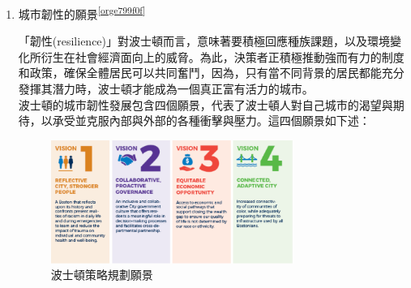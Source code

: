 \documentclass[a4paper,12pt]{article}
\begin{document}
\begin{enumerate}
\begin{enumerate}
\item 城市韌性的願景\textsuperscript{\ref{orge799f0f}}
\label{sec:org61e2866}

「韌性(resilience)」對波士頓而言，意味著要積極回應種族課題，以及環境變化所衍生在社會經濟面向上的威脅。為此，決策者正積極推動強而有力的制度和政策，確保全體居民可以共同奮鬥，因為，只有當不同背景的居民都能充分發揮其潛力時，波士頓才能成為一個真正富有活力的城市。\\

波士頓的城市韌性發展包含四個願景，代表了波士頓人對自己城市的渴望與期待，以承受並克服內部與外部的各種衝擊與壓力。這四個願景如下述：\\
\begin{figure}[htbp]
\centering
\includegraphics[width=300]{images/49132357_938728969849329_1147817099184308224_n.png}
\caption{\label{fig:FigName}波士頓策略規劃願景}
\end{figure}


\end{enumerate}
\end{enumerate}
\end{document}
